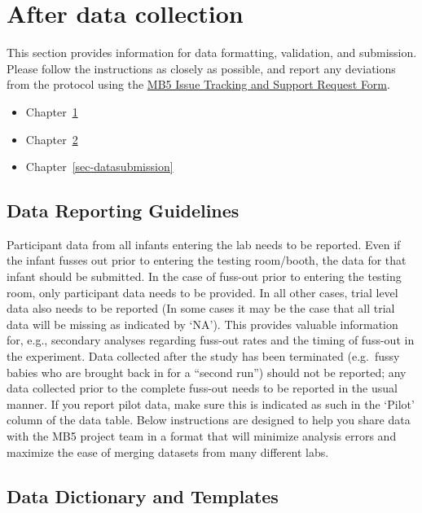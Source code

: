 \documentclass[
  letterpaper,
  DIV=11,
  numbers=noendperiod,
  oneside]{scrreprt}
\providecommand{\tightlist}{%
  \setlength{\itemsep}{0pt}\setlength{\parskip}{0pt}}
\begin{document}
\part{After data collection}

This section provides information for data formatting, validation, and
submission. Please follow the instructions as closely as possible, and
report any deviations from the protocol using the
\href{https://airtable.com/appRoqMKzcK3NsXt4/pagGafhoHcuVMs7ZV/form}{MB5
Issue Tracking and Support Request Form}.

\begin{itemize}
\tightlist
\item
  Chapter~\ref{sec-datareporting}
\item
  Chapter~\ref{sec-datatemplates}
\item
  Chapter~\ref{sec-datasubmission}
\end{itemize}

\chapter{Data Reporting Guidelines}\label{sec-datareporting}

Participant data from all infants entering the lab needs to be reported.
Even if the infant fusses out prior to entering the testing room/booth,
the data for that infant should be submitted. In the case of fuss-out
prior to entering the testing room, only participant data needs to be
provided. In all other cases, trial level data also needs to be reported
(In some cases it may be the case that all trial data will be missing as
indicated by `NA'). This provides valuable information for, e.g.,
secondary analyses regarding fuss-out rates and the timing of fuss-out
in the experiment. Data collected after the study has been terminated
(e.g.~fussy babies who are brought back in for a ``second run'') should
not be reported; any data collected prior to the complete fuss-out needs
to be reported in the usual manner. If you report pilot data, make sure
this is indicated as such in the `Pilot' column of the data table. Below
instructions are designed to help you share data with the MB5 project
team in a format that will minimize analysis errors and maximize the
ease of merging datasets from many different labs.

\chapter{Data Dictionary and Templates}\label{sec-datatemplates}
\end{document}
